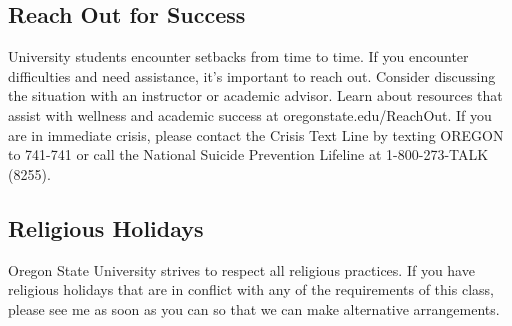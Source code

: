 \documentclass[10pt]{article}
\begin{document}
\subsection*{Reach Out for Success}
University students encounter setbacks from time to time. 
If you encounter difficulties and need assistance, it’s important to reach out. 
Consider discussing the situation with an instructor or academic advisor. 
Learn about resources that assist with wellness and academic success at 
oregonstate.edu/ReachOut. 
If you are in immediate crisis, please contact the Crisis Text Line by texting 
OREGON to 741-741 or call the National Suicide Prevention Lifeline at 
1-800-273-TALK (8255).

\subsection*{Religious Holidays}
Oregon State University strives to respect all religious practices.
If you have religious holidays that are in conflict with any of the requirements of 
this class, please see me as soon as you can so that we can make alternative 
arrangements.
\end{document}
